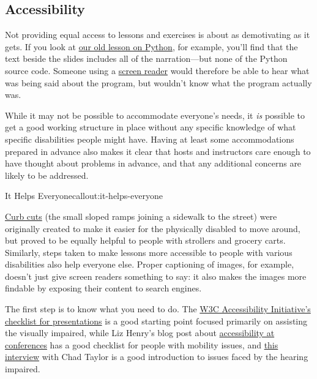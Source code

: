 \subsection{Accessibility}\label{accessibility}

Not providing equal access to lessons and exercises is about as
demotivating as it gets. If you look at
\href{http://swcarpentry.github.io/v4/python/flow.html}{our old lesson
on Python}, for example, you'll find that the text beside the slides
includes all of the narration---but none of the Python source code.
Someone using a
\href{https://en.wikipedia.org/wiki/Screen\_reader}{screen reader} would
therefore be able to hear what was being said about the program, but
wouldn't know what the program actually was.

While it may not be possible to accommodate everyone's needs, it
\emph{is} possible to get a good working structure in place without any
specific knowledge of what specific disabilities people might have.
Having at least some accommodations prepared in advance also makes it
clear that hosts and instructors care enough to have thought about
problems in advance, and that any additional concerns are likely to be
addressed.

\begin{callout}{It Helps Everyone}{callout:it-helps-everyone}

\href{https://en.wikipedia.org/wiki/Curb\_cut}{Curb cuts} (the small
sloped ramps joining a sidewalk to the street) were originally created
to make it easier for the physically disabled to move around, but proved
to be equally helpful to people with strollers and grocery carts.
Similarly, steps taken to make lessons more accessible to people with
various disabilities also help everyone else. Proper captioning of
images, for example, doesn't just give screen readers something to say:
it also makes the images more findable by exposing their content to
search engines.
\end{callout}

The first step is to know what you need to do. The
\href{http://www.w3.org/WAI/training/accessible}{W3C Accessibility
Initiative's checklist for presentations} is a good starting point
focused primarily on assisting the visually impaired, while Liz Henry's
blog post about
\href{https://modelviewculture.com/pieces/unlocking-the-invisible-elevator-accessibility-at-tech-conferences}{accessibility
at conferences} has a good checklist for people with mobility issues,
and
\href{https://modelviewculture.com/pieces/qa-making-tech-events-accessible-to-the-deaf-community}{this
interview} with Chad Taylor is a good introduction to issues faced by
the hearing impaired.

